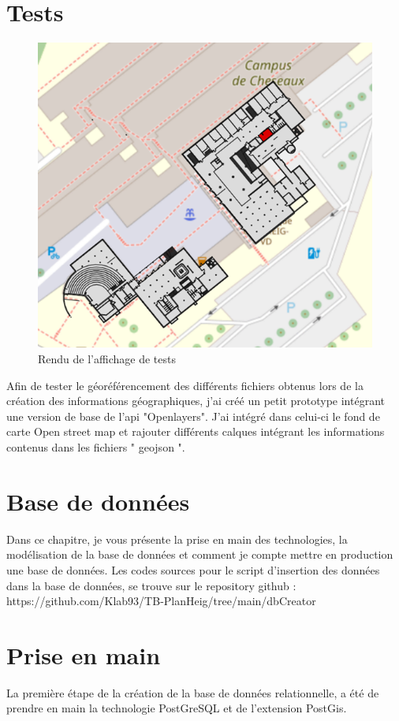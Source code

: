 \documentclass[
    iai, %
    il, %
]{heig-tb}
\begin{document}
\section{Tests}
\begin{figure}[H]
    \caption{Rendu de l'affichage de tests}
    \centering
    \includegraphics{TestsData.png}
\end{figure}

Afin de tester le géoréférencement des différents fichiers obtenus lors de la création des informations géographiques,
j'ai créé un petit prototype intégrant une version de base de l'api "Openlayers".
J'ai intégré dans celui-ci le fond de carte Open street map et rajouter différents calques intégrant les informations contenus dans les fichiers " geojson ".

\section{Base de données}

Dans ce chapitre, je vous présente la prise en main des technologies,
la modélisation de la base de données et comment je compte mettre en production une base de données.
Les codes sources pour le script d'insertion des données dans la base de données,
se trouve sur le repository github : https://github.com/Klab93/TB-PlanHeig/tree/main/dbCreator

\section{Prise en main}
La première étape de la création de la base de données relationnelle,
a été de prendre en main la technologie PostGreSQL et de l'extension PostGis.
\end{document}
